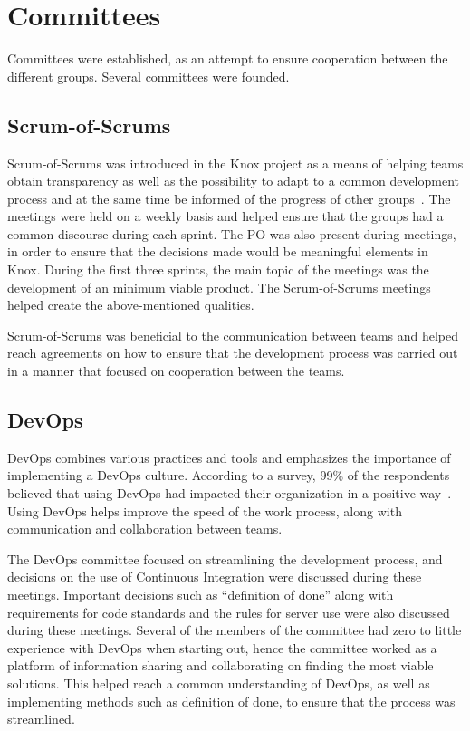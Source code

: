 \section{Committees}\label{SHARED-committees}

Committees were established, as an attempt to ensure cooperation between the different groups. Several committees were founded.

\subsection{Scrum-of-Scrums}
Scrum-of-Scrums was introduced in the Knox project as a means of helping teams obtain transparency as well as the possibility to adapt to a common development process and at the same time be informed of the progress of other groups\ \cite{agile}.
The meetings were held on a weekly basis and helped ensure that the groups had a common discourse during each sprint. 
The PO was also present during meetings, in order to ensure that the decisions made would be meaningful elements in Knox. 
During the first three sprints, the main topic of the meetings was the development of an minimum viable product.
The Scrum-of-Scrums meetings helped create the above-mentioned qualities.

Scrum-of-Scrums was beneficial to the communication between teams and helped reach agreements on how to ensure that the development process was carried out in a manner that focused on cooperation between the teams.

\subsection{DevOps}
DevOps combines various practices and tools and emphasizes the importance of implementing a DevOps culture. According to a survey, 99\% of the respondents believed that using DevOps had impacted their organization in a positive way\ \cite{Atlassian}. Using DevOps helps improve the speed of the work process, along with communication and collaboration between teams.

The DevOps committee focused on streamlining the development process, and decisions on the use of Continuous Integration were discussed during these meetings. 
Important decisions such as “definition of done” along with requirements for code standards and the rules for server use were also discussed during these meetings.
Several of the members of the committee had zero to little experience with DevOps when starting out, hence the committee worked as a platform of information sharing and collaborating on finding the most viable solutions. This helped reach a common understanding of DevOps, as well as implementing methods such as definition of done, to ensure that the process was streamlined.

